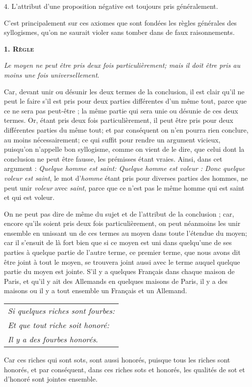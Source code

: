 \smallbreak
$4$. L'attribut d'une proposition négative est toujours pris généralement.

C'est principalement sur ces axiomes que sont fondées les règles générales des syllogismes, qu'on ne saurait violer sans tomber dans de faux raisonnements.

\bigbreak
\bigbreak
\bigbreak

\begin{center}{\bfseries\scshape\large 1. Règle}\end{center}

	\emph{Le moyen ne peut être pris deux fois particulièrement; mais il doit être pris au moins une fois universellement}.

Car, devant unir ou désunir les deux termes de la conclusion, il est clair qu'il ne peut le faire s'il est pris pour deux parties différentes d'un même tout, parce que ce ne sera pas peut-être ; la même partie qui sera unie ou désunie de ces deux termes. Or, étant pris deux fois particulièrement, il peut être pris pour deux différentes parties du même tout; et par conséquent on n'en pourra rien conclure, au moins nécessairement; ce qui suffit pour rendre un argument vicieux, puisqu'on n'appelle bon syllogisme, comme on vient de le dire, que celui dont la conclusion ne peut être fausse, les prémisses étant vraies. Ainsi, dans cet argument : \emph{Quelque homme est saint: Quelque homme est voleur : Donc quelque voleur est saint}, le mot d'\emph{homme} étant pris pour diverses parties des hommes, ne peut unir \emph{voleur} avec \emph{saint}, parce que ce n'est pas le même homme qui est saint et qui est voleur.

On ne peut pas dire de même du sujet et de l'attribut de la conclusion ; car, encore qu'ils soient pris deux fois particulièrement, on peut néanmoins les unir ensemble en unissant un de ces termes au moyen dans toute l'étendue du moyen; car il s'ensuit de là fort bien que si ce moyen est uni dans quelqu'une de ses parties à quelque partie de l'autre terme, ce premier terme, que nous avons dit être joint à tout le moyen, se trouvera joint aussi avec le terme auquel quelque partie du moyen est jointe. S'il y a quelques Français dans chaque maison de Paris, et qu'il y ait des Allemands en quelques maisons de Paris, il y a des maisons ou il y a tout ensemble un Français et un Allemand.

\begin{center}
	\begin{tabular}{l}
\emph{Si quelques riches sont fourbes:} \\
\emph{Et que tout riche soit honoré:} \\
\emph{Il y a des fourbes honorés}. \\
	\end{tabular}
\end{center}
Car ces riches qui sont sots, sont aussi honorés, puisque tous les riches sont honorés, et par conséquent, dans ces riches sots et honorés, les qualités de sot et d'honoré sont jointes ensemble.

